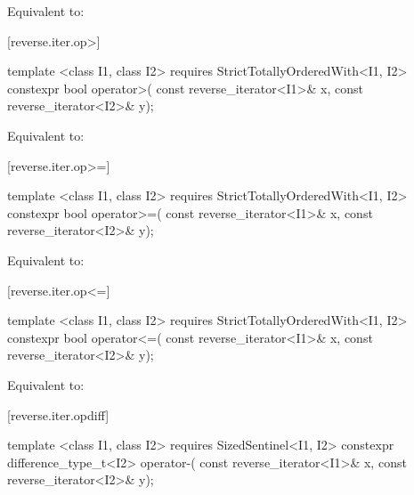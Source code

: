 \begin{itemdescr}
\pnum
\effects Equivalent to:
\end{itemdescr}

[reverse.iter.op>]{}

%
\begin{itemdecl}
template <class I1, class I2>
    requires StrictTotallyOrderedWith<I1, I2>
  constexpr bool operator>(
    const reverse_iterator<I1>& x,
    const reverse_iterator<I2>& y);
\end{itemdecl}

\begin{itemdescr}
\pnum
\effects Equivalent to:
\end{itemdescr}

[reverse.iter.op>=]{}

%
\begin{itemdecl}
template <class I1, class I2>
    requires StrictTotallyOrderedWith<I1, I2>
  constexpr bool operator>=(
    const reverse_iterator<I1>& x,
    const reverse_iterator<I2>& y);
\end{itemdecl}

\begin{itemdescr}
\pnum
\effects Equivalent to:
\end{itemdescr}

[reverse.iter.op<=]{}

%
\begin{itemdecl}
template <class I1, class I2>
    requires StrictTotallyOrderedWith<I1, I2>
  constexpr bool operator<=(
    const reverse_iterator<I1>& x,
    const reverse_iterator<I2>& y);
\end{itemdecl}

\begin{itemdescr}
\pnum
\effects Equivalent to:
\end{itemdescr}

[reverse.iter.opdiff]{}

%
\begin{itemdecl}
template <class I1, class I2>
    requires SizedSentinel<I1, I2>
  constexpr difference_type_t<I2> operator-(
    const reverse_iterator<I1>& x,
    const reverse_iterator<I2>& y);
\end{itemdecl}

